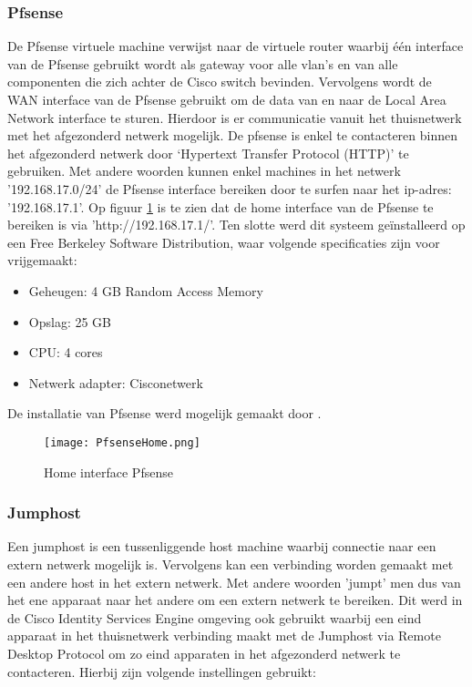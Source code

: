 \subsubsection{Pfsense}
De Pfsense virtuele machine verwijst naar de virtuele router waarbij één interface van de Pfsense gebruikt wordt als gateway voor alle vlan’s en van alle componenten die zich achter de Cisco switch bevinden. Vervolgens wordt de WAN interface van de Pfsense gebruikt om de data van en naar de Local Area Network interface te sturen. Hierdoor is er communicatie vanuit het thuisnetwerk met het afgezonderd netwerk mogelijk.
\newline
\newline
De pfsense is enkel te contacteren binnen het afgezonderd netwerk door ‘Hypertext Transfer Protocol (HTTP)’ te gebruiken. Met andere woorden kunnen enkel machines in het netwerk '192.168.17.0/24' de Pfsense interface bereiken door te surfen naar het ip-adres: '192.168.17.1'. Op figuur \ref{fig:Pfsense} is te zien dat de home interface van de Pfsense te bereiken is via 'http://192.168.17.1/'.
\newline
\newline
Ten slotte werd dit systeem geïnstalleerd op een Free Berkeley Software Distribution, waar volgende specificaties zijn voor vrijgemaakt:  

\begin{itemize}
	\item Geheugen: 4 GB Random Access Memory
	\item Opslag: 25 GB
	\item CPU: 4 cores
	\item Netwerk adapter: Cisco\textunderscore netwerk
\end{itemize}
De installatie van Pfsense werd mogelijk gemaakt door \cite{Pfsense_InstallationGuide}.

\begin{figure}[H]
	\centering
	\texttt{[image: PfsenseHome.png]}
	\caption{Home interface Pfsense}
	\label{fig:Pfsense}
\end{figure}

\subsubsection{Jumphost}
Een jumphost is een tussenliggende host machine waarbij connectie naar een extern netwerk mogelijk is. Vervolgens kan een verbinding worden gemaakt met een andere host in het extern netwerk. Met andere woorden 'jumpt' men dus van het ene apparaat naar het andere om een extern netwerk te bereiken. 
\newline
\newline
Dit werd in de Cisco Identity Services Engine omgeving ook gebruikt waarbij een eind apparaat in het thuisnetwerk verbinding maakt met de Jumphost via Remote Desktop Protocol om zo eind apparaten in het afgezonderd netwerk te contacteren. Hierbij zijn volgende instellingen gebruikt:  
 
